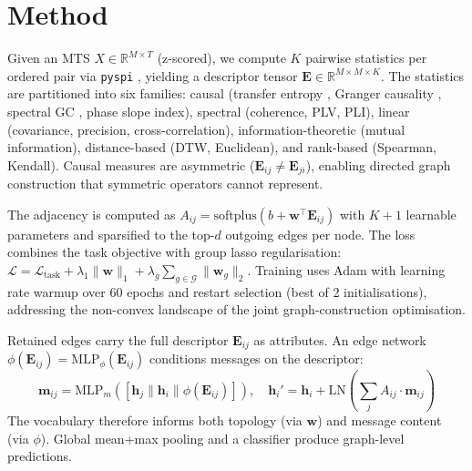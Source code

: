 \documentclass{article}
\theoremstyle{plain}
\begin{document}
\section{Method}
\label{sec:method}

Given an MTS $X \in \mathbb{R}^{M \times T}$ (z-scored), we compute $K$ pairwise statistics per ordered pair via \texttt{pyspi} \citep{cliff2023}, yielding a descriptor tensor $\mathbf{E} \in \mathbb{R}^{M \times M \times K}$. The statistics are partitioned into six families: causal (transfer entropy \citep{schreiber2000}, Granger causality \citep{granger1969}, spectral GC \citep{geweke1982}, phase slope index), spectral (coherence, PLV, PLI), linear (covariance, precision, cross-correlation), information-theoretic (mutual information), distance-based (DTW, Euclidean), and rank-based (Spearman, Kendall). Causal measures are asymmetric ($\mathbf{E}_{ij} \neq \mathbf{E}_{ji}$), enabling directed graph construction that symmetric operators cannot represent.

The adjacency is computed as $A_{ij} = \mathrm{softplus}(b + \mathbf{w}^\top \mathbf{E}_{ij})$ with $K + 1$ learnable parameters and sparsified to the top-$d$ outgoing edges per node. The loss combines the task objective with group lasso regularisation: $\mathcal{L} = \mathcal{L}_{\mathrm{task}} + \lambda_1 \|\mathbf{w}\|_1 + \lambda_g \sum_{g \in \mathcal{G}} \|\mathbf{w}_g\|_2$. Training uses Adam with learning rate warmup over 60 epochs and restart selection (best of 2 initialisations), addressing the non-convex landscape of the joint graph-construction optimisation.

Retained edges carry the full descriptor $\mathbf{E}_{ij}$ as attributes. An edge network $\phi(\mathbf{E}_{ij}) = \mathrm{MLP}_\phi(\mathbf{E}_{ij})$ conditions messages on the descriptor:
%
\begin{equation}
\mathbf{m}_{ij} = \mathrm{MLP}_m([\mathbf{h}_j \| \mathbf{h}_i \| \phi(\mathbf{E}_{ij})]), \quad \mathbf{h}_i' = \mathbf{h}_i + \mathrm{LN}\!\left(\textstyle\sum_j A_{ij} \cdot \mathbf{m}_{ij}\right)
\end{equation}
%
The vocabulary therefore informs both topology (via $\mathbf{w}$) and message content (via $\phi$). Global mean+max pooling and a classifier produce graph-level predictions.

\end{document}

